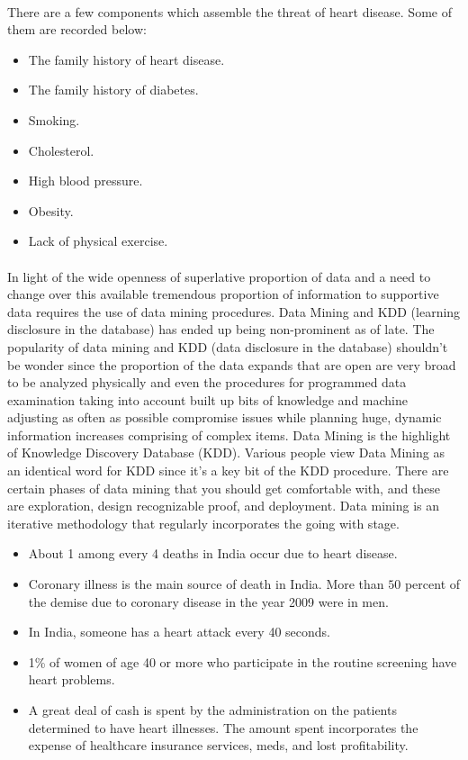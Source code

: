 \documentclass[oneside,12pt]{Classes/VTU}
\begin{document}
    \paragraph{}
    There are a few components which assemble the threat of heart disease. Some of them are recorded below:
    \begin{itemize}
    	\item The family history of heart disease.
    	\item The family history of diabetes.
    	\item Smoking.
    	\item Cholesterol.
    	\item High blood pressure.
    	\item Obesity.
    	\item Lack of physical exercise.
    \end{itemize}
    \paragraph{}
    In light of the wide openness of superlative proportion of data and a need to change over this available tremendous proportion of information to supportive data requires the use of data mining procedures. Data Mining and KDD (learning disclosure in the database) has ended up being non-prominent as of late. The popularity of data mining and KDD (data disclosure in the database) shouldn't be wonder since the proportion of the data expands that are open are very broad to be analyzed physically and even the procedures for programmed data examination taking into account built up bits of knowledge and machine adjusting as often as possible compromise issues while planning huge, dynamic information increases comprising of complex items. Data Mining is the highlight of Knowledge Discovery Database (KDD). Various people view Data Mining as an identical word for KDD since it's a key bit of the KDD procedure. There are certain phases of data mining that you should get comfortable with, and these are exploration, design recognizable proof, and deployment. Data mining is an iterative methodology that regularly incorporates the going with stage.
    \pagebreak
    \begin{itemize}
    	\item About 1 among every 4 deaths in India occur due to heart disease.
    	\item Coronary illness is the main source of death in India. More than $50$ percent of the demise due to coronary disease in the year 2009 were in men.
    	\item In India, someone has a heart attack every 40 seconds.
    	\item 1\% of women of age 40 or more who participate in the routine screening have heart problems.
    	\item A great deal of cash is spent by the administration on the patients determined to have heart illnesses. The amount spent incorporates the expense of healthcare insurance services, meds, and lost profitability.
    \end{itemize}
    
\end{document}
